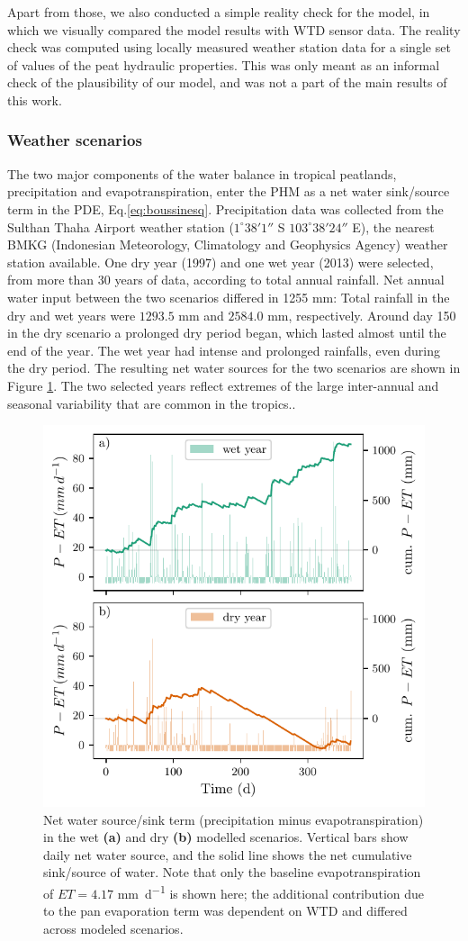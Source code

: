 \documentclass[bg, manuscript]{copernicus}
\begin{document}
Apart from those, we also conducted a simple reality check for the model, in which we visually compared the model results with WTD sensor data.
The reality check was computed using locally measured weather station data for a single set of values of the peat  hydraulic properties.
This was only meant as an informal check of the  plausibility of our model, and was not a part of the main results of this work.


\subsubsection{Weather scenarios}
The two major components of the water balance in tropical peatlands, precipitation and evapotranspiration, enter the PHM as a net water sink/source term in the PDE, Eq.\eqref{eq:boussinesq}.
Precipitation data was collected from the Sulthan Thaha Airport weather station ($1^\circ 38' 1''$ S $103^\circ 38' 24''$ E), the nearest BMKG (Indonesian Meteorology, Climatology and Geophysics Agency) weather station available.
One dry year (1997) and one wet year (2013) were selected, from more than 30 years of data, according to total annual rainfall.
Net annual water input between the two scenarios differed in 1255 \unit{mm}: Total rainfall in the dry and wet years were $1293.5$ \unit{mm} and $2584.0$ \unit{mm}, respectively.
Around day 150 in the dry scenario a prolonged dry period began, which lasted almost until the end of the year.
The wet year had intense and prolonged rainfalls, even during the dry period.
The resulting net water sources for the two scenarios are shown in Figure \ref{fig:p_minus_et}.
The two selected years  reflect extremes of the large inter-annual and seasonal variability that are common in the tropics..

\begin{figure}[t]
\includegraphics[width=8.3 cm]{figs/P_minus_ET.pdf}
\caption{Net water source/sink term (precipitation minus evapotranspiration) in the wet \textbf{(a)} and dry \textbf{(b)} modelled scenarios. Vertical bars show daily net water source, and the solid line shows the net cumulative sink/source of water.  Note that only the baseline evapotranspiration of $ET = 4.17$ \unit{mm d^{-1}} is shown here; the additional contribution due to the pan evaporation term was dependent on WTD and differed across modeled scenarios.}
\label{fig:p_minus_et}
\end{figure}   
\end{document}
